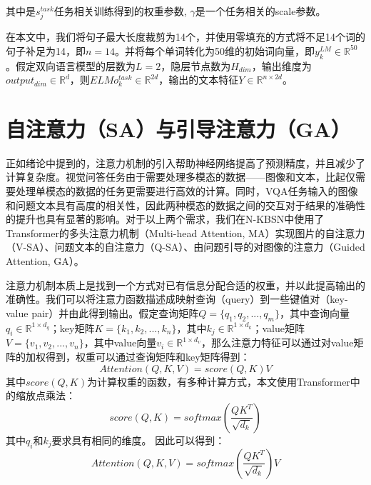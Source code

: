 其中是$s_j^{task}$任务相关训练得到的权重参数, $\gamma$是一个任务相关的scale参数。

在本文中，我们将句子最大长度裁剪为14个，并使用零填充的方式将不足14个词的句子补足为14，即$n=14$。并将每个单词转化为50维的初始词向量，即$y_k^{LM}\in \mathbb{R}^{50}$。假定双向语言模型的层数为$L = 2$，隐层节点数为$H_{dim}$，输出维度为$output_{dim} \in \mathbb{R}^d$，则$ELMo_k^{task} \in \mathbb{R}^{2d}$，输出的文本特征$Y \in \mathbb{R}^{n\times 2d}$。

\section{自注意力（SA）与引导注意力（GA）}
正如绪论中提到的，注意力机制的引入帮助神经网络提高了预测精度，并且减少了计算复杂度。视觉问答任务由于需要处理多模态的数据——图像和文本，比起仅需要处理单模态的数据的任务更需要进行高效的计算。同时，VQA任务输入的图像和问题文本具有高度的相关性，因此两种模态的数据之间的交互对于结果的准确性的提升也具有显著的影响。对于以上两个需求，我们在N-KBSN中使用了Transformer的多头注意力机制（Multi-head Attention, MA）实现图片的自注意力（V-SA）、问题文本的自注意力（Q-SA）、由问题引导的对图像的注意力（Guided Attention, GA）。

注意力机制本质上是找到一个方式对已有信息分配合适的权重，并以此提高输出的准确性。我们可以将注意力函数描述成映射查询（query）到一些键值对（key-value pair）并由此得到输出。假定查询矩阵$Q = \{q_1, q_2, ..., q_m\}$，其中查询向量$q_i \in \mathbb{R}^{1 \times d_q}$；key矩阵$K = \{k_1, k_2, ..., k_n\}$，其中$k_j\in \mathbb{R}^{1 \times d_k}$；value矩阵$V = \{v_1, v_2, ..., v_n\}$，其中value向量$v_i \in \mathbb{R}^{1 \times d_v}$，那么注意力特征可以通过对value矩阵的加权得到，权重可以通过查询矩阵和key矩阵得到：
\begin{equation}
Attention(Q, K, V) = score(Q, K)V
\end{equation}
其中$score(Q, K)$为计算权重的函数，有多种计算方式，本文使用Transformer中的缩放点乘法：
\begin{equation}
score(Q, K) = softmax(\frac{QK^T}{\sqrt{d_k}})
\end{equation}
其中$q_i$和$k_j$要求具有相同的维度。
因此可以得到：
\begin{equation}
Attention(Q, K, V) = softmax(\frac{QK^T}{\sqrt{d_k}})V
\end{equation}

